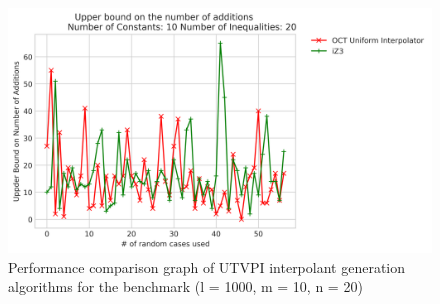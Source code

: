 \begin{figure}[!ht]
  \centering
  \includegraphics[scale=0.6]{figures/octi_performance_add_ops_10_20_100.png}
  \caption{Performance comparison graph of UTVPI interpolant generation
  algorithms for the benchmark (l = 1000, m = 10, n = 20)} 

  \label{performance_graph_oct_4}
\end{figure}


